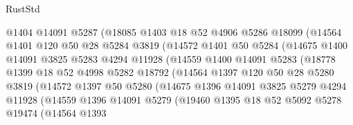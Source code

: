 \begin{lexlean}{RustStd}
\begin{coremodule}
                    @1404
                    @14091
                    @5287
                    (@18085
                      @1403
                      @18
                      @52
                      @4906
                      @5286
                      @18099
                      (@14564
                        @1401
                        @120
                        @50
                        @28
                        @5284
                        @3819
                        (@14572
                          @1401
                          @50
                          @5284
                          (@14675
                            @1400
                            @14091
                            @3825
                            @5283
                            @4294
                            @11928
                            (@14559
                              @1400
                              @14091
                              @5283
                              (@18778
                                @1399
                                @18
                                @52
                                @4998
                                @5282
                                @18792
                                (@14564
                                  @1397
                                  @120
                                  @50
                                  @28
                                  @5280
                                  @3819
                                  (@14572
                                    @1397
                                    @50
                                    @5280
                                    (@14675
                                      @1396
                                      @14091
                                      @3825
                                      @5279
                                      @4294
                                      @11928
                                      (@14559
                                        @1396
                                        @14091
                                        @5279
                                        (@19460
                                          @1395
                                          @18
                                          @52
                                          @5092
                                          @5278
                                          @19474
                                          (@14564
                                            @1393

\end{coremodule}
\end{lexlean}
